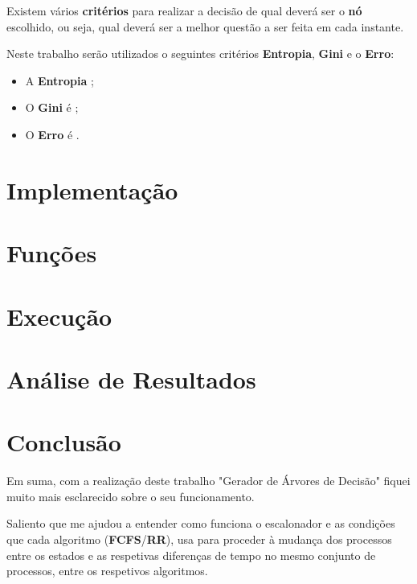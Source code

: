 \documentclass[11pt]{article}   %
\begin{document}
Existem vários \textbf{critérios} para realizar a decisão de qual deverá ser o \textbf{nó} escolhido, ou seja,
qual deverá ser a melhor questão a ser feita em cada instante. \par
Neste trabalho serão utilizados o seguintes critérios \textbf{Entropia}, \textbf{Gini} e o \textbf{Erro}:
\begin{itemize}
    \item A \textbf{Entropia} ; 
    \item O \textbf{Gini} é ; 
    \item O \textbf{Erro} é .
\end{itemize}

\section{Implementação}

\section{Funções}
\section{Execução}

\section{Análise de Resultados}
\newpage
\section{Conclusão} %
\hspace{0,5cm}Em suma, com a realização deste trabalho "Gerador de Árvores de Decisão" fiquei muito mais esclarecido sobre o seu funcionamento. \par
Saliento que me ajudou a entender como funciona o escalonador e as condições que cada algoritmo (\textbf{FCFS}/\textbf{RR}), usa para proceder à mudança dos processos entre os estados e as respetivas diferenças de tempo no mesmo conjunto de processos, entre os respetivos algoritmos.  
\end{document}
